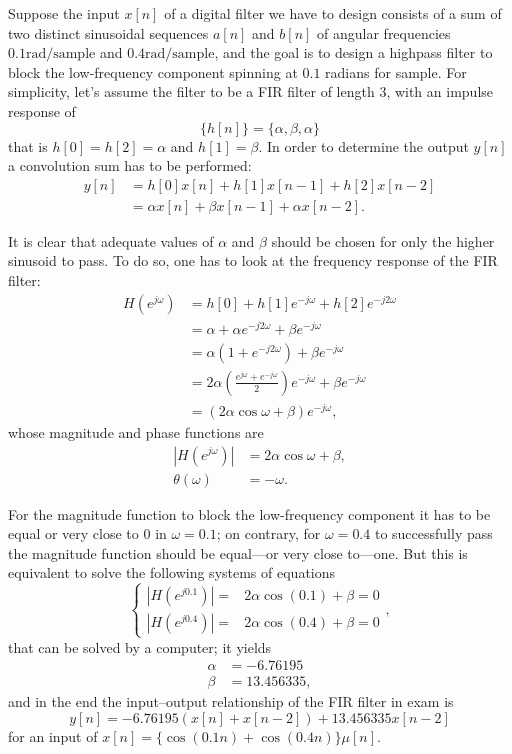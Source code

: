 \documentclass[\documentfontsize, twocolumn]{\classname}
\begin{document}
Suppose the input $x[n]$ of a digital filter we have to design consists of a sum of two distinct sinusoidal sequences $a[n]$ and $b[n]$ of angular frequencies $0.1 \mbox{rad/sample}$ and $0.4 \mbox{rad/sample}$, and the goal is to design a highpass filter to block the low-frequency component spinning at $0.1$ radians for sample. For simplicity, let's assume the filter to be a FIR filter of length $3$, with an impulse response of 
\[
    \{h[n]\} = \{\alpha, \beta, \alpha\}
\]
that is $h[0] = h[2] = \alpha$ and $h[1] = \beta$. In order to determine the output $y[n]$ a convolution sum has to be performed:
\begin{align*}
    y[n] 
    &= h[0]x[n] + h[1]x[n-1] + h[2]x[n-2]\\
    &= \alpha x[n] + \beta x[n-1] + \alpha x[n-2].
\end{align*}

It is clear that adequate values of $\alpha$ and $\beta$ should be chosen for only the higher sinusoid to pass. To do so, one has to look at the frequency response of the FIR filter:
\begin{align*}
    H(e^{j\omega})
        &= h[0] + h[1]e^{-j\omega} + h[2]e^{-j2\omega}\\
        &= \alpha + \alpha e^{-j2\omega} + \beta e^{-j\omega}\\
        &= \alpha (1 + e^{-j2\omega}) + \beta e^{-j\omega}\\
        &= 2\alpha \left(\frac{e^{j\omega} + e^{-j\omega}}{2}\right)e^{-j\omega} + \beta e^{-j\omega}\\
        &= (2\alpha \cos{\omega} + \beta) e^{-j\omega},
\end{align*}
whose magnitude and phase functions are 
\begin{align*}
    \left|H(e^{j\omega})\right| &= 2 \alpha \cos\omega + \beta,\\
    \theta(\omega) &= -\omega.
\end{align*}

For the magnitude function to block the low-frequency component it has to be equal or very close to $0$ in $\omega=0.1$; on contrary, for $\omega=0.4$ to successfully pass the magnitude function should be equal---or very close to---one. But this is equivalent to solve the following systems of equations
\[
\left\{
    \begin{array}{ll}
        \left|H(e^{j0.1})\right| =& 2\alpha \cos{(0.1)} + \beta = 0\\
        \left|H(e^{j0.4})\right| =& 2\alpha \cos{(0.4)} + \beta = 0
    \end{array}
\right.,
\]
that can be solved by a computer; it yields
\begin{align*}
    \alpha &= -6.76195\\
    \beta  &= 13.456335,
\end{align*}
and in the end the input--output relationship of the FIR filter in exam is
\[
    y[n] = -6.76195(x[n] + x[n-2]) + 13.456335x[n-2]
\]
for an input of $x[n] = \{\cos{(0.1n)} + \cos{(0.4n)}\}\mu[n]$.
\end{document}
